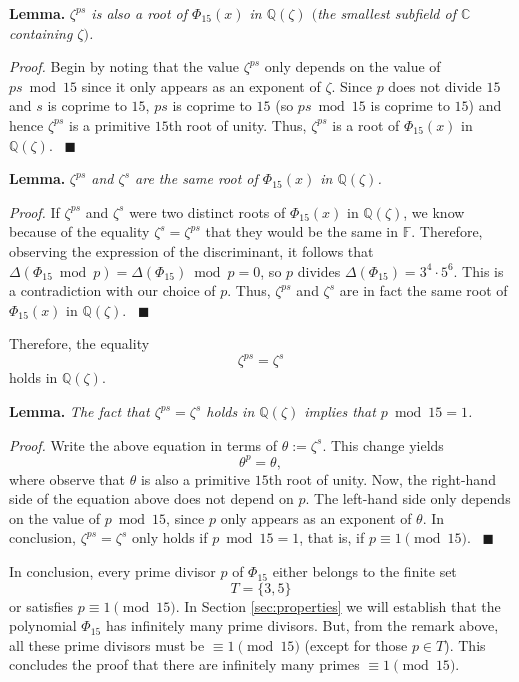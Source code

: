 \documentclass[a4paper, 12pt]{article}
\theoremstyle{definition}
\newcommand{\Q}{\mathbb{Q}}
\newcommand{\C}{\mathbb{C}}
\newcommand{\F}{\mathbb{F}}
\begin{document}
\textbf{Lemma.} \emph{$\zeta^{ps}$ is also a root of $\Phi_{15}(x)$ in $\Q(\zeta)$ $($the smallest subfield of $\C$ containing $\zeta)$.}

\textit{Proof.} Begin by noting that the value $\zeta^{ps}$ only depends on the value of $ps \bmod{15}$ since it only appears as an exponent of $\zeta$. Since $p$ does not divide $15$ and $s$ is coprime to $15$, $ps$ is coprime to $15$ (so $ps \bmod{15}$ is coprime to $15$) and hence $\zeta^{ps}$ is a primitive $15$th root of unity. Thus, $\zeta^{ps}$ is a root of $\Phi_{15}(x)$ in $\Q(\zeta)$. \ $\blacksquare$

\textbf{Lemma.} \emph{$\zeta^{ps}$ and $\zeta^{s}$ are the same root of $\Phi_{15}(x)$ in $\Q(\zeta)$.}

\textit{Proof.} If $\zeta^{ps}$ and $\zeta^{s}$ were two distinct roots of $\Phi_{15}(x)$ in $\Q(\zeta)$, we know because of the equality $\zeta^{s}=\zeta^{ps}$ that they would be the same in $\F$. Therefore, observing the expression of the discriminant, it follows that $\Delta(\Phi_{15} \bmod{p})=\Delta(\Phi_{15}) \bmod{p}=0$, so $p$ divides $\Delta(\Phi_{15})=3^{4} \cdot 5^{6}$. This is a contradiction with our choice of $p$. Thus, $\zeta^{ps}$ and $\zeta^{s}$ are in fact the same root of $\Phi_{15}(x)$ in $\Q(\zeta)$. \ $\blacksquare$

Therefore, the equality
\begin{equation}\label{eq:equality_in_zeta}
\zeta^{ps}=\zeta^{s}
\end{equation}
holds in $\Q(\zeta)$. 

\textbf{Lemma.} \emph{The fact that $\zeta^{ps}=\zeta^{s}$ holds in $\Q(\zeta)$ implies that $p \bmod{15}=1$.}

\textit{Proof.} Write the above equation in terms of $\theta:=\zeta^{s}$. This change yields
\begin{equation*}
\theta^{p}=\theta,
\end{equation*}
where observe that $\theta$ is also a primitive $15$th root of unity. Now, the right-hand side of the equation above does not depend on $p$. The left-hand side only depends on the value of $p\bmod{15}$, since $p$ only appears as an exponent of $\theta$. In conclusion, $\zeta^{ps}=\zeta^{s}$ only holds if $p \bmod{15}=1$, that is, if $p\equiv 1\pmod{15}$. \ $\blacksquare$

In conclusion, every prime divisor $p$ of $\Phi_{15}$ either belongs to the finite set 
\begin{equation*}
T=\{3, 5\}
\end{equation*}
or satisfies $p\equiv 1 \pmod{15}$. In Section \ref{sec:properties} we will establish that the polynomial $\Phi_{15}$ has infinitely many prime divisors. But, from the remark above, all these prime divisors must be $\equiv 1\pmod{15}$ (except for those $p\in T$). This concludes the proof that there are infinitely many primes $\equiv 1 \pmod{15}$.
\end{document}
